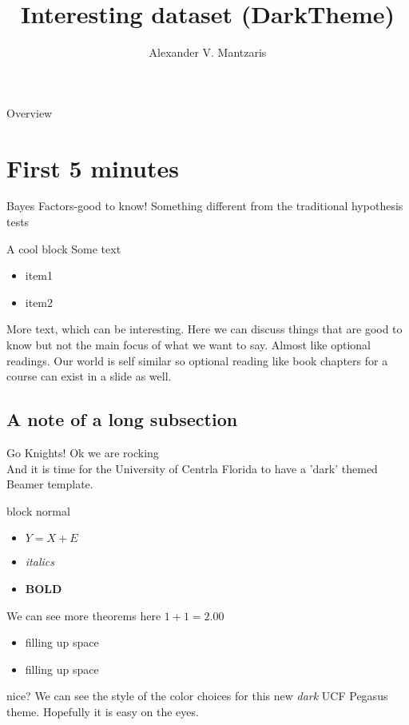 \documentclass{beamer}
\title[GoKnights]{Interesting dataset (DarkTheme)}
\author{Alexander V. Mantzaris}
\date{\vspace{-8cm}}
\begin{document}
\begin{frame}
  \titlepage
\end{frame}

\begin{frame}{Overview}
\tableofcontents
\end{frame}

\section{First 5 minutes}

\begin{frame}{Bayes Factors-good to know!} 
  Something different from the traditional hypothesis tests
  \begin{block}{A cool block}
    Some text
    \begin{itemize}
    \item item1
    \item item2
    \end{itemize}
  \end{block}
  More text, which can be interesting. Here we can discuss things that are good to know but not the main focus of what we want to say. Almost like optional readings. Our world is self similar so optional reading like book chapters for a course can exist in a slide as well.
\end{frame}


\subsection{A note of a long subsection}
\begin{frame}{Go Knights!}
  \vspace{-.2cm}
  Ok we are rocking\\
  And it is time for the University of Centrla Florida to have a 'dark' themed Beamer template.
  \begin{block}{block normal}
    \begin{itemize}
    \item $Y = X + E$
    \item \emph{italics}
      \item \textbf{BOLD}
    \end{itemize}
  \end{block}
  \begin{block}{We can see more theorems here}
    $1+1 = 2.00$
    \begin{itemize}
    \item filling up space
    \item filling up space
    \end{itemize}
    nice? We can see the style of the color choices for this new \emph{dark} UCF Pegasus theme. Hopefully it is easy on the eyes.
  \end{block}
  
\end{frame}
\end{document}
